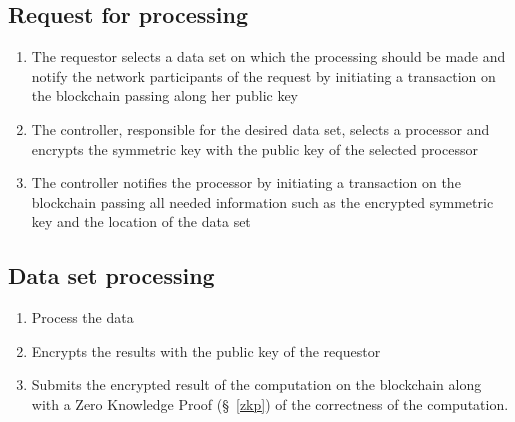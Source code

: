 \subsection{Request for processing}
\label{solution:flow:pr_reg}

\begin{enumerate}
  \item The requestor selects a data set on which the processing should be made and  notify the network participants of the request by initiating a transaction on the blockchain passing along her public key
  \item The controller, responsible for the desired data set, selects a processor and encrypts the symmetric key with the public key of the selected processor
  \item The controller notifies the processor by initiating a transaction on the blockchain passing all needed information such as the encrypted symmetric key and the location of the data set
\end{enumerate}

\subsection{Data set processing}
\label{solution:flow:pr_data}

\begin{enumerate}
  \item Process the data
  \item Encrypts the results with the public key of the requestor
  \item Submits the encrypted result of the computation on the blockchain along with a Zero Knowledge Proof (§~\ref{zkp}) of the correctness of the computation.
\end{enumerate}

